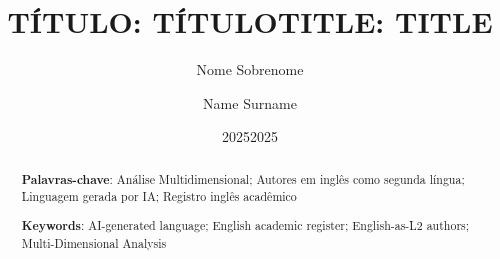 \title{\Large \MakeUppercase{Título: título}}
\author{Nome Sobrenome} %
\date{2025}
\maketitle
\renewcommand{\abstractname}{Resumo}
\begin{abstract}
    \lipsum[1]

    \vspace{1em}
    \textbf{Palavras-chave}: Análise Multidimensional; Autores em inglês como segunda língua; Linguagem gerada por IA; Registro inglês acadêmico
\end{abstract}

\title{\Large \MakeUppercase{Title: title}}
\author{Name Surname} %
\date{2025}
\maketitle
\begin{abstract}
    \lipsum[1]

    \vspace{1em}
    \textbf{Keywords}: AI-generated language; English academic register; English-as-L2 authors; Multi-Dimensional Analysis
\end{abstract}


\listoffigures
\thispagestyle{empty}
\listoftables
\thispagestyle{empty}
\tableofcontents
\thispagestyle{empty}
\clearpage
{}
\setcounter{page}{15} %
